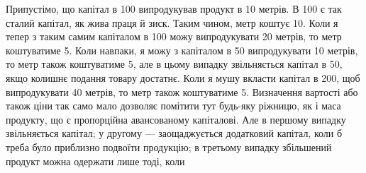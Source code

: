 Припустімо, що капітал в 100 випродукував продукт в 10 метрів. В 100 є так
сталий капітал, як жива праця й зиск. Таким чином, метр коштує 10. Коли я тепер з
таким самим капіталом в 100 можу випродукувати 20 метрів, то метр коштуватиме 5.
Коли навпаки, я можу з капіталом в 50 випродукувати 10 метрів, то метр також
коштуватиме 5, але в цьому випадку звільняється капітал в 50, якщо колишнє подання
товару достатнє. Коли я мушу вкласти капітал в 200, щоб випродукувати
40 метрів, то метр також коштуватиме 5. Визначення вартості або також ціни так
само мало дозволяє помітити тут будь-яку ріжницю, як і маса продукту, що є пропорційна авансованому
капіталові. Але в першому випадку звільняється капітал; у
другому — заощаджується додатковий капітал, коли б треба було приблизно подвоїти
продукцію; в третьому випадку збільшений продукт можна одержати лише тоді, коли
\parbreak{}  %
